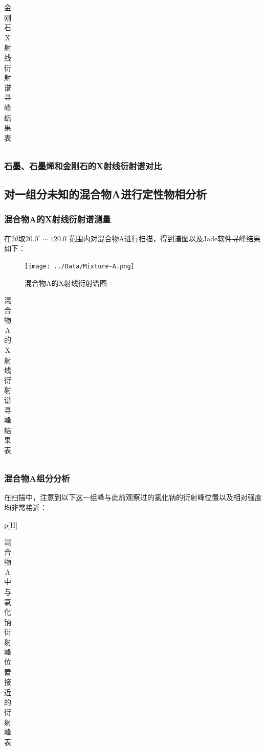 \documentclass{thuemp}
\begin{document}
\begin{table}
    \centering
    \captionnamefont{\wuhao\bf\heiti}
    \captiontitlefont{\wuhao\bf\heiti}
    \caption{金刚石X射线衍射谱寻峰结果表}
    \label{tab:diamond_xrd}
    \liuhao
    \begin{tabular}{ccccc}
        \toprule
        \midrule
        \bottomrule
    \end{tabular}
\end{table}



\subsubsection{石墨、石墨烯和金刚石的X射线衍射谱对比}

\subsection{对一组分未知的混合物A进行定性物相分析}

\subsubsection{混合物A的X射线衍射谱测量}

在$2\theta$取$20.0^\circ \sim 120.0^\circ$范围内对混合物A进行扫描，得到谱图以及Jade软件寻峰结果如下：

\begin{figure}[H]
    \centering
    \texttt{[image: ../Data/Mixture-A.png]}
    \caption{混合物A的X射线衍射谱图}
    \label{fig:mixture_a_xrd}
\end{figure}

\begin{table}
    \centering
    \captionnamefont{\wuhao\bf\heiti}
    \captiontitlefont{\wuhao\bf\heiti}
    \caption{混合物A的X射线衍射谱寻峰结果表}
    \label{tab:mixture_a_xrd}
    \liuhao
    \begin{tabular}{ccccc}
        \toprule
        \midrule
        \bottomrule
    \end{tabular}
\end{table}

\subsubsection{混合物A组分分析}

在扫描中，注意到以下这一组峰与此前观察过的氯化钠的衍射峰位置以及相对强度均非常接近：

\begin{table}p[H]
    \centering
    \captionnamefont{\wuhao\bf\heiti}
    \captiontitlefont{\wuhao\bf\heiti}
    \caption{混合物A中与氯化钠衍射峰位置接近的衍射峰表}
    \label{tab:mixture_a_nacl_peaks}
    \liuhao
    \begin{tabular}{ccccc}
        \toprule
        \midrule
        \bottomrule
    \end{tabular}
\end{table}
\end{document}

